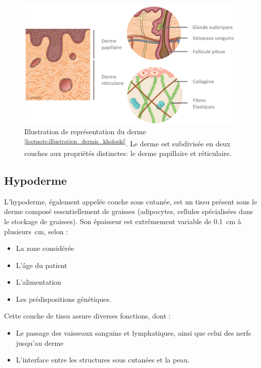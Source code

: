 \begin{figure}[H]
    \centering
    \includegraphics[width=\linewidth]{contents/chapter_1/resources/illustration_dermis_kholoski.pdf}
    \caption{Illustration de représentation du derme \textsuperscript{\ref{footnote:illustration_dermis_kholoski}}. Le derme est subdivisée en deux couches aux propriétés distinctes: le derme papillaire et réticulaire.}
    \label{fig:illustration_dermis_kholoski}
\end{figure}\par

\addtocounter{footnote}{1}
\clearpage

\subsection{Hypoderme}
L’hypoderme, également appelée couche sous cutanée, est un tissu présent sous le derme composé essentiellement de graisses (adipocytes, cellules spécialisées dans le stockage de graisses). Son épaisseur est extrêmement variable de \SI{0,1}{\centi\metre} à \SI[parse-numbers = false]{plusieurs}{\centi\metre}, selon :
\begin{itemize}
\item La zone considérée
\item L’âge du patient
\item L’alimentation
\item Les prédispositions génétiques.
\end{itemize}\par

Cette couche de tissu assure diverses fonctions, dont :
\begin{itemize}
\item Le passage des vaisseaux sanguins et lymphatiques, ainsi que celui des nerfs jusqu’au derme
\item L’interface entre les structures sous cutanées et la peau.
\end{itemize}\par

